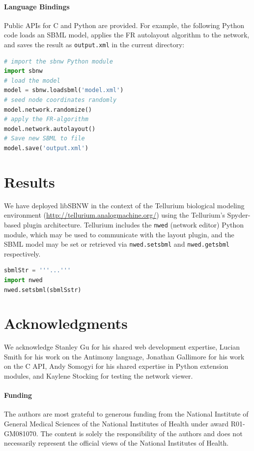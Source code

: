 \documentclass{bioinfo}
\begin{document}
\paragraph{Language Bindings}
Public APIs for C and Python are provided.
For example, the following Python code loads
an SBML model, applies the FR autolayout algorithm to the network, and saves the result as \texttt{output.xml} in the current directory:

\medskip
\noindent

\begin{lstlisting}[language=python]
# import the sbnw Python module
import sbnw
# load the model
model = sbnw.loadsbml('model.xml')
# seed node coordinates randomly
model.network.randomize()
# apply the FR-algorithm
model.network.autolayout()
# Save new SBML to file
model.save('output.xml')
\end{lstlisting}

\section{Results}

We have deployed libSBNW in the context of the Tellurium biological modeling environment (\href{http://tellurium.analogmachine.org/}{http://tellurium.analog\-mach\-ine.org/}) using the Tellurium's Spyder-based plugin architecture.
Tellurium includes the \texttt{nwed} (network editor) Python module, which may be used to communicate with the layout plugin, and
the SBML model may be set or retrieved via \texttt{nwed.setsbml} and
\texttt{nwed.getsbml} respectively.
%
\begin{lstlisting}[language=python]
sbmlStr = '''...'''
import nwed
nwed.setsbml(sbmlSstr)
\end{lstlisting}

\section*{Acknowledgments}
We acknowledge Stanley Gu for his shared web development expertise, Lucian Smith for his work on the Antimony language, Jonathan Gallimore for his work on the C API, Andy Somogyi for his shared expertise in Python extension modules, and Kaylene Stocking for testing the network viewer.

\paragraph{Funding\textcolon} The authors are most grateful to generous funding from the National Institute of General Medical Sciences of the National Institutes of Health under award R01-GM081070. The content is solely the responsibility of the authors and does not necessarily represent the official views of the National Institutes of Health.
\end{document}

